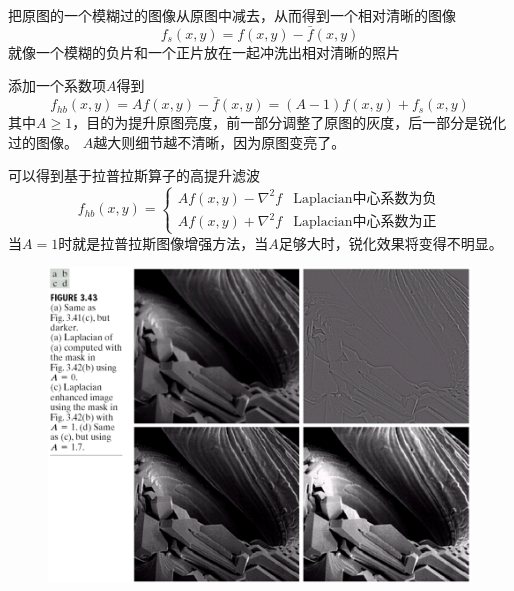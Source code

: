 \begin{definition}
把原图的一个模糊过的图像从原图中减去，从而得到一个相对清晰的图像
\[f_s(x,y)=f(x,y)-\bar{f}(x,y)\]
就像一个模糊的负片和一个正片放在一起冲洗出相对清晰的照片
\end{definition}
\begin{definition}
添加一个系数项$A$得到
\[f_{hb}(x,y)=Af(x,y)-\bar{f}(x,y)=(A-1)f(x,y)+f_s(x,y)\]
其中$A\geq 1$，目的为提升原图亮度，前一部分调整了原图的灰度，后一部分是锐化过的图像。
$A$越大则细节越不清晰，因为原图变亮了。
\end{definition}

可以得到基于拉普拉斯算子的高提升滤波
\[f_{hb}(x,y)=
\begin{cases}
Af(x,y)-\nabla^2 f & \text{Laplacian中心系数为负}\\
Af(x,y)+\nabla^2 f & \text{Laplacian中心系数为正}
\end{cases}\]
当$A=1$时就是拉普拉斯图像增强方法，当$A$足够大时，锐化效果将变得不明显。
\begin{figure}[H]
\centering
\includegraphics[width=0.6\linewidth]{fig/high-boost.png}
\end{figure}

